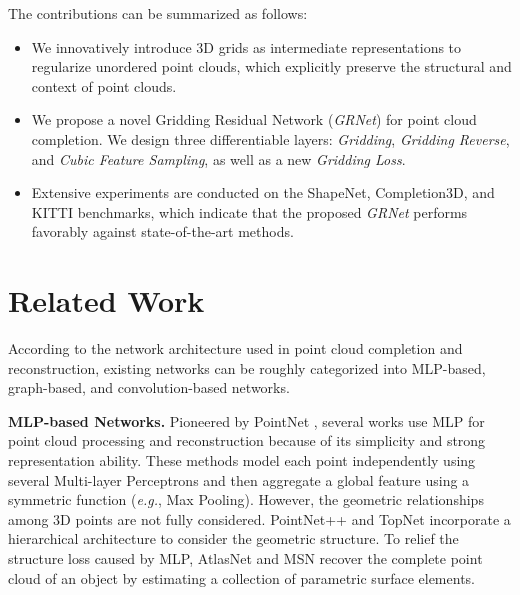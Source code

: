 \documentclass[runningheads]{llncs}
\begin{document}
The contributions can be summarized as follows:

\begin{itemize}
  \item We innovatively introduce 3D grids as intermediate representations to regularize unordered point clouds, which explicitly preserve the structural and context of point clouds.
  \item We propose a novel Gridding Residual Network ({\it GRNet}) for point cloud completion. We design three differentiable layers: {\it Gridding}, {\it Gridding Reverse}, and {\it Cubic Feature Sampling}, as well as a new {\it Gridding Loss}.
  \item Extensive experiments are conducted on the ShapeNet, Completion3D, and KITTI benchmarks, which indicate that the proposed {\it GRNet} performs favorably against state-of-the-art methods.
\end{itemize}

\section{Related Work}

According to the network architecture used in point cloud completion and reconstruction, existing networks can be roughly categorized into MLP-based, graph-based, and convolution-based networks.

\noindent \textbf{MLP-based Networks.}
Pioneered by PointNet \cite{DBLP:conf/cvpr/QiSMG17}, several works use MLP for point cloud processing \cite{DBLP:conf/icml/AchlioptasDMG18,DBLP:conf/icmcs/LinXTCD19} and reconstruction \cite{DBLP:conf/ThreeDim/YuanKHMH18,DBLP:conf/wacv/MandikalR19} because of its simplicity and strong representation ability.
These methods model each point independently using several Multi-layer Perceptrons and then aggregate a global feature using a symmetric function ({\it e.g.}, Max Pooling).
However, the geometric relationships among 3D points are not fully considered.
PointNet++ \cite{DBLP:conf/nips/QiYSG17} and TopNet \cite{DBLP:conf/cvpr/TchapmiKR0S19} incorporate a hierarchical architecture to consider the geometric structure.
To relief the structure loss caused by MLP, AtlasNet \cite{DBLP:conf/cvpr/GroueixFKRA18} and MSN \cite{DBLP:conf/aaai/LiuSYSH20} recover the complete point cloud of an object by estimating a collection of parametric surface elements.
\end{document}
